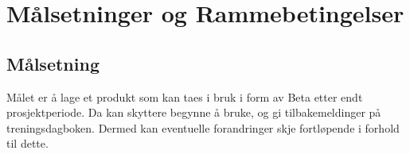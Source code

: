\chapter{Målsetninger og Rammebetingelser}

\section{Målsetning}
Målet er å lage et produkt som kan taes i bruk i form av Beta etter endt prosjektperiode. Da kan skyttere begynne å bruke, og gi tilbakemeldinger på treningsdagboken. Dermed kan eventuelle forandringer skje fortløpende i forhold til dette.




